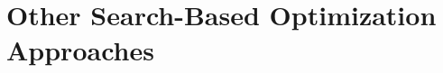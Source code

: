 \chapter{Other Search-Based Optimization Approaches}
\label{chp:other-search-based-optimization-approaches}
